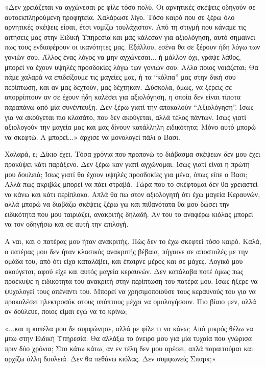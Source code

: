 \documentclass[12pt,twoside, openany]{book}
\begin{document}
«Δεν χρειάζεται να αγχώνεσαι ρε φίλε τόσο πολύ. Οι αρνητικές σκέψεις οδηγούν σε αυτοεκπληρούμενη προφητεία. Χαλάρωσε λίγο. Τόσο καιρό που σε ξέρω όλο αρνητικές σκέψεις είσαι, έτσι νομίζω τουλάχιστον. Από τη στιγμή που κάναμε τις αιτήσεις μας στην Ειδική Υπηρεσία και μας κάλεσαν για αξιολόγηση, αυτό σημαίνει πως τους ενδιαφέρουν οι ικανότητες μας. Εξάλλου, εσένα θα σε ξέρουν ήδη λόγω των γονιών σου. Άλλος ένας λόγος να μην αγχώνεσαι... ή μάλλον όχι, γράψε λάθος, μπορεί να έχουν υψηλές προσδοκίες λόγω των γονιών σου. Αλλα ποιος νοιάζεται; Θα πάμε χαλαρά να επιδείξουμε τις μαγείες μας, ή τα “κόλπα” μας στην δική σου περίπτωση, και αν μας δεχτούν, μας δέχτηκαν. Δύσκολα, όμως, να ξέρεις σε απορρίπτουν αν σε έχουν ήδη καλέσει για αξιολόγηση, η οποία δεν είναι τίποτα παραπάνω από μία συνέντευξη. Δεν ξέρω γιατί την αποκαλούν “Αξιολόγηση”. Ίσως για να ακούγεται πιο κλασάτο, που δεν ακούγεται, αλλά τέλος πάντων. Ίσως γιατί αξιολογούν την μαγεία μας και μας δίνουν κατάλληλη ειδικότητα; Μόνο αυτό μπορώ να σκεφτώ. Α μπορεί...» άρχισε να μονολογεί πάλι ο Βασι.

Χαλαρά, ε; Δίκιο έχει. Τόσα χρόνια που προπονώ το διάβασμα σκέψεων δεν μου έχει προκύψει κάτι παράξενο. Δεν ξέρω καν γιατί αγχώνομαι. Ίσως γιατί είναι η πρώτη μου δουλειά; Ίσως γιατί θα έχουν υψηλές προσδοκίες για μένα, όπως είπε ο Βασι; Αλλά πως ακριβώς μπορεί να πάει στραβά. Τώρα που το σκέφτομαι δεν θα χρειαστεί να κάνω και κάτι περίπλοκο. Απλά θα πω στον αξιολογητή ότι έχω μαγεία Κεραυνών, αλλά μπορώ να διαβάζω σκέψεις ξέρω γω και πιθανότατα θα μου δώσει την ειδικότητα που μου ταιριάζει, ανακριτής δηλαδή. Αν του το αναφέρω κιόλας μπορεί να τον οδηγήσω και σε αυτή την επιλογή. 

Α ναι, και ο πατέρας μου ήταν ανακριτής. Πώς δεν το έχω σκεφτεί τόσο καιρό. Καλά, ο πατέρας μου δεν ήταν κλασικός ανακριτής βέβαια, πήγαινε σε αποστολές με την ομάδα του, από ότι είχα καταλάβει, και έπαιρνε μέρος και σε μάχες. Λογικό μου ακούγεται, αφού είχε και αυτός μαγεία κεραυνών. Δεν κατάλαβα ποτέ όμως πως προέκυψε η ειδικότητα του ανακριτή στην περίπτωση του πατέρα μου. Ίσως ήξερε να ψυχολογεί τους απέναντι του. Μπορεί να χρησιμοποιούσε τους κεραυνούς του για να προκαλέσει ηλεκτροσόκ στους υπόπτους μέχρι να ομολογήσουν. Πιο βίαιο μεν, αλλά αν δούλευε, ποιος είμαι εγώ να το κρίνω;

«...και η κοπέλα μου δε συμφώνησε, αλλά ρε φίλε τι να κάνω; Από μικρός θέλω να μπω στην Ειδική Υπηρεσία. Θα αλλάξω το όνειρο μου για μία τυχαία που γνώρισα πριν δύο χρόνια; Στο κάτω κάτω, αν εν τέλη δεν μου αρέσει, απλά παραιτούμαι και αρχίζω άλλη δουλειά. Δεν θα πεθάνω κιόλας. Δεν συμφωνείς Σπαρκ;»
\end{document}
